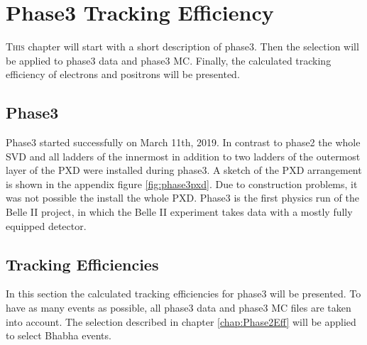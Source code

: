 \documentclass[a4paper,11pt,twosided,final,german,openbib,pdftex,listof=totoc,bibliography=totoc]{scrbook}
\begin{document}
\chapter{Phase3 Tracking Efficiency}
\label{chp:TrackingEfficiencyPhase3}

\lettrine{T}{his} chapter will start with a short description of phase3. Then the selection will be applied to phase3 data and phase3 MC. Finally, the calculated tracking efficiency of electrons and positrons will be presented.

\section{Phase3}
\label{sec:P3}

Phase3 started successfully on March 11th, 2019. In contrast to phase2 the whole SVD and all ladders of the innermost in addition to two ladders of the outermost layer of the PXD were installed during phase3. A sketch of the PXD arrangement is shown in the appendix figure \ref{fig:phase3pxd}. Due to construction problems, it was not possible the install the whole PXD. Phase3 is the first physics run of the Belle II project, in which the Belle II experiment takes data with a mostly fully equipped detector.\cite{phase3}





\section{Tracking Efficiencies}

In this section the calculated tracking efficiencies for phase3 will be presented. To have as many events as possible, all phase3 data and phase3 MC files are taken into account. 
The selection described in chapter \ref{chap:Phase2Eff} will be applied to select Bhabha events.
\end{document}
